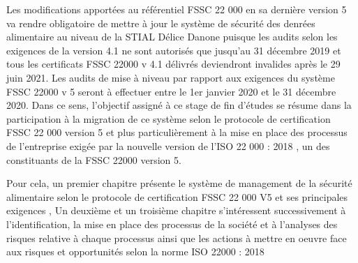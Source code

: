 \begin{spacing}{1.2}
Les modifications  apportées au référentiel FSSC 22 000 en sa dernière version 5 va  rendre obligatoire de mettre  à jour le système de sécurité des denrées alimentaire au niveau de la STIAL Délice Danone puisque les audits selon les exigences de la version 4.1 ne sont autorisés que jusqu'au 31 décembre 2019 et tous les certificats FSSC 22000 v 4.1 délivrés deviendront invalides après le 29 juin 2021. Les audits de mise à niveau par rapport aux exigences du système FSSC 22000 v 5 seront à effectuer entre le 1er janvier 2020 et le 31 décembre 2020. Dans ce sens, l'objectif assigné à ce stage de fin d’études se résume dans la participation à la migration  de ce système selon le protocole de certification FSSC 22 000 version 5 et plus particulièrement à la mise en place des processus de l’entreprise exigée par la nouvelle version de l’ISO 22 000 : 2018 , un des constituants de la FSSC 22000 version 5.\newline


Pour cela, un premier chapitre présente le système de management de la sécurité alimentaire selon le protocole de certification FSSC 22 000 V5 et ses principales exigences , Un deuxième et un troisième chapitre s'intéressent successivement  à l’identification, la mise en place des processus de la société  et à l’analyses des risques relative à chaque processus ainsi que les actions à mettre en oeuvre face aux risques et opportunités selon la norme ISO 22000 : 2018\newline



\end{spacing}
